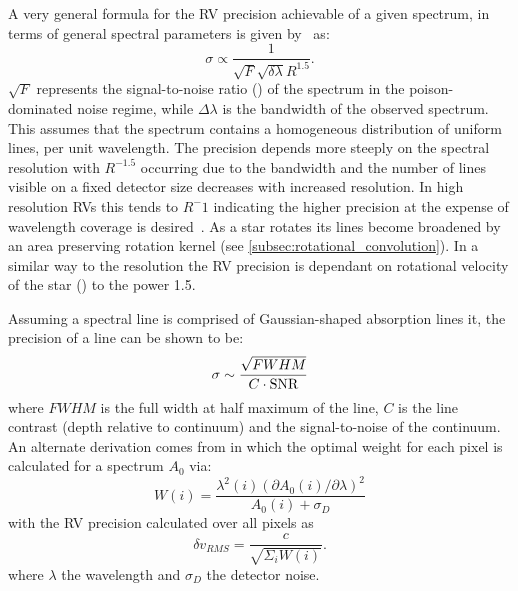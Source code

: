 A very general formula for the RV precision achievable of a given  spectrum, in terms of general spectral parameters is given by~\citet{hatzes_spectrograph_1992} as:
\begin{equation}
\sigma \propto \frac{1}{\sqrt{F} \sqrt{\delta \lambda} R^{1.5}}.
\end{equation}
$\sqrt{F}$ represents the signal-to-noise ratio (\snr{}) of the spectrum in the poison-dominated noise regime, while $\Delta \lambda$ is the bandwidth of the observed spectrum. This assumes that the spectrum contains a homogeneous distribution of uniform lines, per unit wavelength.
The precision depends more steeply on the spectral resolution with $R^{-1.5}$ occurring due  to the bandwidth and the number of lines visible on  a fixed detector size decreases with increased resolution.
In high resolution RVs this tends to $R^-{1}$ indicating the higher precision at the expense of wavelength coverage is desired~\citet{hatzes_spectrograph_1992}.
As a star rotates its lines become broadened by an area preserving rotation kernel (see \cref{subsec:rotational_convolution}).
In a similar way to the resolution the RV precision is dependant on rotational velocity of the star (\Vsini) to the power 1.5.

Assuming a spectral line is comprised of Gaussian-shaped absorption lines it, the precision of a line can be shown to be:
\begin{equation}
    \sigma \sim \frac{\sqrt{FWHM}}{C \cdot \textrm{SNR}}
\end{equation}
where $FWHM$ is the full width at half maximum of the line, $C$ is the line contrast (depth relative to continuum) and \snr{} the signal-to-noise of the continuum.
An alternate derivation comes from \citet{bouchy_fundamental_2001} in which the optimal weight for each pixel is calculated for a spectrum $A_0$ via:
\begin{equation}
    W(i) = \frac{\lambda^{2}(i) {(\partial A_0(i)/\partial\lambda)}^{2}}{A_0(i) + \sigma_D} \label{eqn:pixel_weigth}
\end{equation}
with the RV precision calculated over all pixels as
\begin{equation}
    \delta v_{RMS} = \frac{c}{\sqrt{\Sigma_i W(i)}}.
\end{equation}
where $\lambda$ the wavelength and $\sigma_D$ the detector noise.


